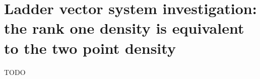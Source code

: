 \documentclass[12pt]{amsart}
\theoremstyle{case}
\begin{document}

\section{Ladder vector system investigation: the rank one density is equivalent to the two point density}
  TODO



\end{document}
